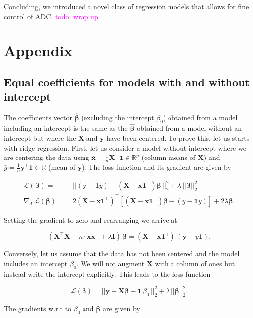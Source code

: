 \documentclass[utf8]{frontiersSCNS} %
\newcommand{\todo}[1]{\textcolor{Magenta}{todo: #1}}
\renewcommand{\b}{\boldsymbol{\beta}} %
\newcommand{\bh}{\boldsymbol{\hat{\beta}}} %
\newcommand{\I}{\mathbf{I}}
\renewcommand{\L}{\mathcal{L}}
\newcommand{\mx}{\mathbf{\bar{x}}}
\newcommand{\my}{\bar{y}}
\newcommand{\one}{\mathbf{1}}
\newcommand{\R}{\mathbb{R}}
\newcommand{\X}{\mathbf{X}}
\newcommand{\y}{\mathbf{y}}
\begin{document}
Concluding, we introduced a novel class of regression models that allows for fine control of ADC. \todo{wrap up}

\section{Appendix}

\subsection{Equal coefficients for models with and without intercept}\label{app:same_coefficients}

The coefficients vector $\bh$ (excluding the intercept $\beta_0$) obtained from a model including an intercept is the same as the $\bh$ obtained from a model without an intercept but where the $\X$ and $\y$ have been centered. To prove this, let us starts with ridge regression. First, let us consider a model without intercept where we are centering the data using $\mx=\frac{1}{n}\X^\top\one\in\R^p$ (column means of $\X$) and $\my=\frac{1}{n}\y^\top\one\in\R$ (mean of $\y$). The loss function and its gradient are given by

\begin{equation*}
\begin{split}
\L(\b) =&\ ||(\y-\one\my) - (\X - \mx\one^\top)\b\,||^2_2 + \lambda\,||\b||^2_2\\
\nabla_{\b}\, \L(\b) =&\ 2(\X-\mx\one^\top)^\top[(\X-\mx\one^\top)\b - (y-\one\my)] + 2\lambda\b.
\end{split}
\end{equation*}


Setting the gradient to zero and rearranging we arrive at 

\begin{equation}\label{eq:equal_coefficients1}
(\X^\top\X - n\cdot\mx\mx^\top + \lambda\I)\,\b = (\X-\mx\one^\top)\,(\y-\my\one).
\end{equation}

Conversely, let us assume that the data has not been centered and the model includes an intercept $\beta_0$.
We will not augment $\X$ with a column of ones but instead write the intercept explicitly. This leads to the loss function 

\[
\L(\b) = ||\y - \X\b - \one\,\beta_0\,||^2_2 + \lambda\,||\b||^2_2.
\]

The gradients w.r.t to $\beta_0$ and $\b$ are given by
\end{document}
